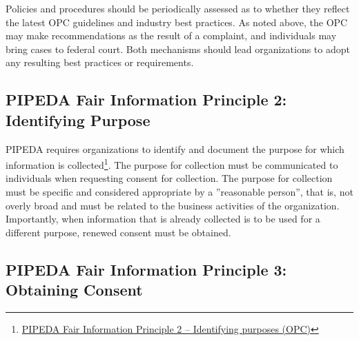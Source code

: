 Policies and procedures should be periodically assessed as to whether they reflect the latest OPC guidelines and industry best practices. As noted above, the OPC may make recommendations as the result of a complaint, and individuals may bring cases to federal court. Both mechanisms should lead organizations to adopt any resulting best practices or requirements. 

\subsection*{PIPEDA Fair Information Principle 2: Identifying Purpose}

PIPEDA requires organizations to identify and document the purpose for which information is collected\footnote{\href{https://www.priv.gc.ca/en/privacy-topics/privacy-laws-in-canada/the-personal-information-protection-and-electronic-documents-act-pipeda/p_principle/principles/p_purposes/}{PIPEDA Fair Information Principle 2 -- Identifying purposes (OPC)}}. The purpose for collection must be communicated to individuals when requesting consent for collection. The purpose for collection must be specific and considered appropriate by a ''reasonable person'', that is, not overly broad and must be related to the business activities of the organization. Importantly, when information that is already collected is to be used for a different purpose, renewed consent must be obtained. 

\subsection*{PIPEDA Fair Information Principle 3: Obtaining Consent}

